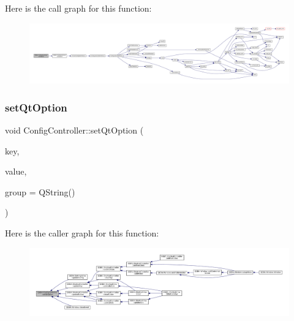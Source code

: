 Here is the call graph for this function\+:
\nopagebreak
\begin{figure}[H]
\begin{center}
\leavevmode
\includegraphics[width=350pt]{class_q_g_b_a_1_1_config_controller_ad4512bbe0cc12a07bdd1bc1091767be9_cgraph}
\end{center}
\end{figure}
\mbox{\label{class_q_g_b_a_1_1_config_controller_a26176eb3e6f0a90d93e8222338513657}} 
\subsubsection{\texorpdfstring{set\+Qt\+Option}{setQtOption}}
{\footnotesize\ttfamily void Config\+Controller\+::set\+Qt\+Option (\begin{DoxyParamCaption}\item[{const Q\+String \&}]{key,  }\item[{const Q\+Variant \&}]{value,  }\item[{const Q\+String \&}]{group = {\ttfamily QString()} }\end{DoxyParamCaption})\hspace{0.3cm}{\ttfamily [slot]}}

Here is the caller graph for this function\+:
\nopagebreak
\begin{figure}[H]
\begin{center}
\leavevmode
\includegraphics[width=350pt]{class_q_g_b_a_1_1_config_controller_a26176eb3e6f0a90d93e8222338513657_icgraph}
\end{center}
\end{figure}
\mbox{\label{class_q_g_b_a_1_1_config_controller_a059a8c29f3461330f6118749f6115e71}} 
